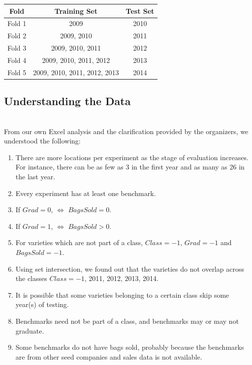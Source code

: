 \documentclass[psamsfonts]{amsart}
\begin{document}
\begin{center}
\begin{tabular}{ |c| c |c| }
\hline
 Fold & Training Set & Test Set \\ [0.5ex] 
 \hline\hline
 Fold 1 & 2009 & 2010 \\ 
 Fold 2 & 2009, 2010 & 2011 \\  
 Fold 3 & 2009, 2010, 2011 & 2012  \\
 Fold 4 & 2009, 2010, 2011, 2012 & 2013 \\
 Fold 5 & 2009, 2010, 2011, 2012, 2013 & 2014 \\
\hline
\end{tabular} 
\end{center}
\vspace{5mm}

\subsection*{Understanding the Data}
\hfill \\

From our own Excel analysis and the clarification provided by the organizers, we understood the following:
\begin{enumerate}
\item There are more locations per experiment as the stage of evaluation increases. For instance, there can be as few as 3 in the first year and as many as 26 in the last year.
\item Every experiment has at least one benchmark.
\item If $Grad = 0$, $\iff$ $BagsSold = 0$. 
\item If $Grad = 1$, $\iff$ $BagsSold > 0$. 
\item For varieties which are not part of a class, $Class = -1$, $Grad = -1$ and $BagsSold = -1$.
\item Using set intersection, we found out that the varieties do not overlap across the classes $Class = -1$, 2011, 2012, 2013, 2014.
\item It is possible that some varieties belonging to a certain class skip some year(s) of testing.
\item Benchmarks need not be part of a class, and benchmarks may or may not graduate.
\item Some benchmarks do not have bags sold, probably because the benchmarks are from other seed companies and sales data is not available.
\end{enumerate}
\end{document}
